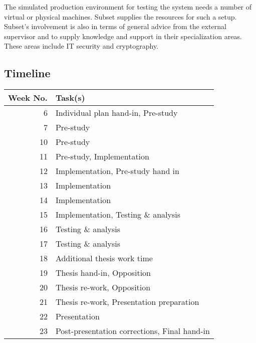 \documentclass{article}
\begin{document}
The simulated production environment for testing the system needs a number of virtual or physical machines. Subset supplies the resources for such a setup. Subset's involvement is also in terms of general advice from the external supervisor and to supply knowledge and support in their specialization areas. These areas include IT security and cryptography.

\subsection*{Timeline}

\begin{figure*}[h!]
	\begin{tabular}{r|l}
		Week No. & Task(s)                                      \\
		\hline
		6        & Individual plan hand-in, Pre-study           \\
		7        & Pre-study                                    \\
		10       & Pre-study                                    \\
		11       & Pre-study, Implementation                    \\
		12       & Implementation, Pre-study hand in            \\
		13       & Implementation                               \\
		14       & Implementation                               \\
		15       & Implementation, Testing \& analysis          \\
		16       & Testing \& analysis                          \\
		17       & Testing \& analysis                          \\
		18       & Additional thesis work time                  \\
		19       & Thesis hand-in, Opposition                   \\
		20       & Thesis re-work, Opposition                   \\
		21       & Thesis re-work, Presentation preparation     \\
		22       & Presentation                                 \\
		23       & Post-presentation corrections, Final hand-in \\
																																																																																																																																																																																																												
	\end{tabular}
\end{figure*}

\printglossaries



\end{document}
